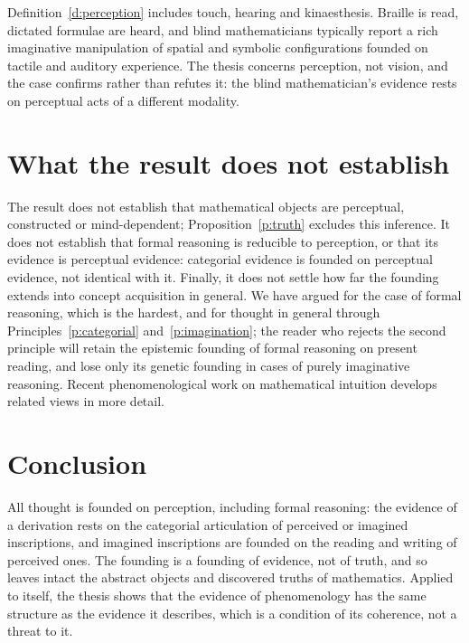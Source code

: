 \documentclass{situationist-preprint}
\begin{document}
\begin{reply}
Definition~\ref{d:perception} includes touch, hearing and kinaesthesis. Braille is read, dictated formulae are heard, and blind mathematicians typically report a rich imaginative manipulation of spatial and symbolic configurations founded on tactile and auditory experience. The thesis concerns perception, not vision, and the case confirms rather than refutes it: the blind mathematician's evidence rests on perceptual acts of a different modality.
\end{reply}

\section{What the result does not establish}

The result does not establish that mathematical objects are perceptual, constructed or mind-dependent; Proposition~\ref{p:truth} excludes this inference. It does not establish that formal reasoning is reducible to perception, or that its evidence is perceptual evidence: categorial evidence is founded on perceptual evidence, not identical with it. Finally, it does not settle how far the founding extends into concept acquisition in general. We have argued for the case of formal reasoning, which is the hardest, and for thought in general through Principles~\ref{p:categorial} and~\ref{p:imagination}; the reader who rejects the second principle will retain the epistemic founding of formal reasoning on present reading, and lose only its genetic founding in cases of purely imaginative reasoning. Recent phenomenological work on mathematical intuition \citep{Tieszen1989,Hopkins2011} develops related views in more detail.

\section{Conclusion}

All thought is founded on perception, including formal reasoning: the evidence of a derivation rests on the categorial articulation of perceived or imagined inscriptions, and imagined inscriptions are founded on the reading and writing of perceived ones. The founding is a founding of evidence, not of truth, and so leaves intact the abstract objects and discovered truths of mathematics. Applied to itself, the thesis shows that the evidence of phenomenology has the same structure as the evidence it describes, which is a condition of its coherence, not a threat to it.
\end{document}
